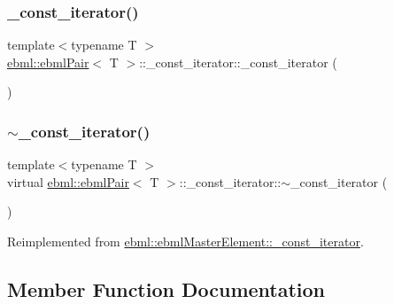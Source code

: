 \subsubsection{\texorpdfstring{\+\_\+const\+\_\+iterator()}{\_const\_iterator()}\hspace{0.1cm}{\footnotesize\ttfamily [3/3]}}
{\footnotesize\ttfamily template$<$typename T $>$ \\
\mbox{\hyperlink{classebml_1_1ebmlPair}{ebml\+::ebml\+Pair}}$<$ T $>$\+::\+\_\+const\+\_\+iterator\+::\+\_\+const\+\_\+iterator (\begin{DoxyParamCaption}{ }\end{DoxyParamCaption})}

\mbox{\label{classebml_1_1ebmlPair_1_1__const__iterator_a2031860865632624af0ff271e7442089}} 
\subsubsection{\texorpdfstring{$\sim$\+\_\+const\+\_\+iterator()}{~\_const\_iterator()}}
{\footnotesize\ttfamily template$<$typename T $>$ \\
virtual \mbox{\hyperlink{classebml_1_1ebmlPair}{ebml\+::ebml\+Pair}}$<$ T $>$\+::\+\_\+const\+\_\+iterator\+::$\sim$\+\_\+const\+\_\+iterator (\begin{DoxyParamCaption}{ }\end{DoxyParamCaption})\hspace{0.3cm}{\ttfamily [virtual]}}



Reimplemented from \mbox{\hyperlink{classebml_1_1ebmlMasterElement_1_1__const__iterator_a6138f42b88ff06379d96a095a12ed136}{ebml\+::ebml\+Master\+Element\+::\+\_\+const\+\_\+iterator}}.



\subsection{Member Function Documentation}
\mbox{\label{classebml_1_1ebmlPair_1_1__const__iterator_a585b8bfa69c6746da17393207e599bca}} 
